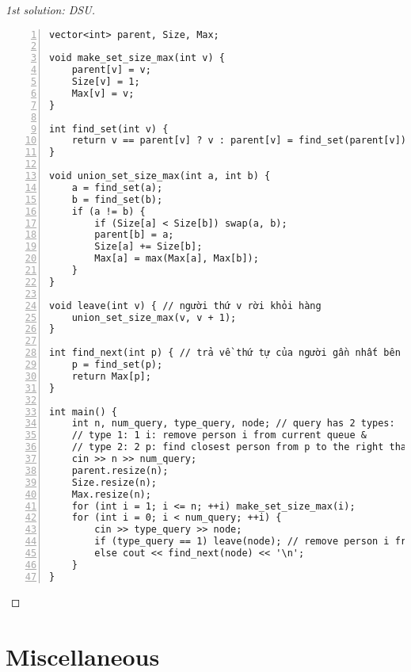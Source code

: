 \documentclass{article}
\begin{document}
\begin{proof}[1st solution: DSU]
\begin{Verbatim}[numbers=left,xleftmargin=5mm]
vector<int> parent, Size, Max;

void make_set_size_max(int v) {
    parent[v] = v;
    Size[v] = 1;
    Max[v] = v;
}

int find_set(int v) {
    return v == parent[v] ? v : parent[v] = find_set(parent[v]);
}

void union_set_size_max(int a, int b) {
    a = find_set(a);
    b = find_set(b);
    if (a != b) {
        if (Size[a] < Size[b]) swap(a, b);
        parent[b] = a;
        Size[a] += Size[b];
        Max[a] = max(Max[a], Max[b]);
    }
}

void leave(int v) { // người thứ v rời khỏi hàng
    union_set_size_max(v, v + 1);
}

int find_next(int p) { // trả về thứ tự của người gần nhất bên phải vị trí p mà chưa rời khỏi hàng
    p = find_set(p);
    return Max[p];
}

int main() {
    int n, num_query, type_query, node; // query has 2 types:
    // type 1: 1 i: remove person i from current queue &
    // type 2: 2 p: find closest person from p to the right that is still in the queue
    cin >> n >> num_query;
    parent.resize(n);
    Size.resize(n);
    Max.resize(n);
    for (int i = 1; i <= n; ++i) make_set_size_max(i);
    for (int i = 0; i < num_query; ++i) {
        cin >> type_query >> node;
        if (type_query == 1) leave(node); // remove person i from current queue
        else cout << find_next(node) << '\n';
    }
}
    \end{Verbatim}
\end{proof}


\section{Miscellaneous}


\printbibliography[heading=bibintoc]
\end{document}
